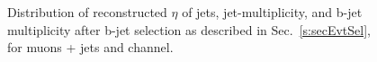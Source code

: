 \begin{figure}
    \caption{Distribution of reconstructed $\eta$ of jets, jet-multiplicity, and 
        b-jet multiplicity after b-jet selection as described in 
        Sec.~\ref{s:secEvtSel}, for muons + jets and \ejets channel.}
    \label{fig:btagPlot2}
\end{figure}

